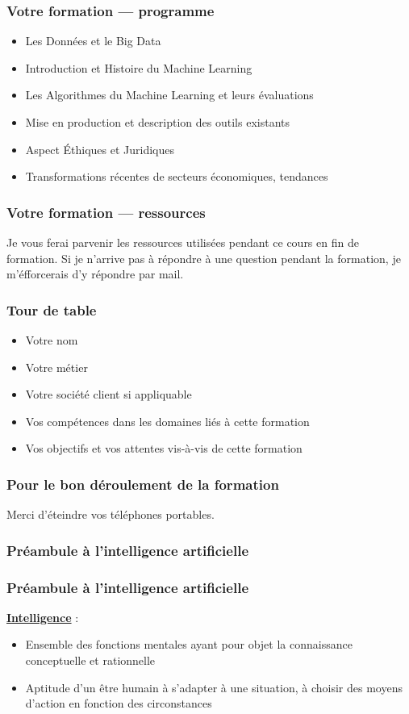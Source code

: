 \documentclass{formation}
\begin{document}
\begin{frame}
  \frametitle{Votre formation — programme}
  \begin{itemize}
  \item Les Données et le Big Data
  \item Introduction et Histoire du Machine Learning
  \item Les Algorithmes du Machine Learning et leurs évaluations
  \item Mise en production et description des outils existants
  \item Aspect Éthiques et Juridiques
  \item Transformations récentes de secteurs économiques, tendances
  \end{itemize}
\end{frame}

\begin{frame}
  \frametitle{Votre formation — ressources}
  Je vous ferai parvenir les ressources utilisées pendant ce cours en fin de formation.
  Si je n'arrive pas à répondre à une question pendant la formation, je m'éfforcerais d'y répondre par mail.
\end{frame}

\begin{frame}
  \frametitle{Tour de table}
  \begin{itemize}
  \item Votre nom
  \item Votre métier
  \item Votre société client si appliquable
  \item Vos compétences dans les domaines liés à cette formation
  \item Vos objectifs et vos attentes vis-à-vis de cette formation
  \end{itemize}
\end{frame}

\begin{frame}
  \frametitle{Pour le bon déroulement de la formation}
  Merci d'éteindre vos téléphones portables.
\end{frame}

\begin{frame}
  \frametitle{Préambule à l'intelligence artificielle}
  \begin{center}
    \huge{}
  \end{center}
\end{frame}

\begin{frame}
  \frametitle{Préambule à l'intelligence artificielle}
  \underline{\textbf{Intelligence}} :
  \begin{itemize}
  \item Ensemble des fonctions mentales ayant pour objet la connaissance conceptuelle et rationnelle
  \item Aptitude d'un être humain à s'adapter à une situation, à choisir des moyens d'action en fonction des circonstances
  \end{itemize}
\end{frame}
\end{document}
